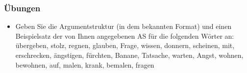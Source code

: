\begin{frame}
\frametitle{Übungen}

\begin{itemize}

	\item Geben Sie die Argumentstruktur (in dem bekannten Format) und einen Beispielsatz der von Ihnen angegebenen AS für die folgenden Wörter an:\\
	übergeben, stolz, regnen, glauben, Frage, wissen, donnern, scheinen, mit, erschrecken, ängstigen, fürchten, Banane, Tatsache, warten, Angst, wohnen, bewohnen, auf, malen, krank, bemalen, fragen

\end{itemize}

\end{frame}
